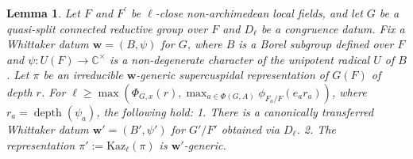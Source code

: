 \documentclass[american]{article}
\numberwithin{equation}{section}
\numberwithin{figure}{section}
\theoremstyle{plain}
\newtheorem{lemma}[theorem]{Lemma}
\theoremstyle{definition}
\theoremstyle{remark}
\begin{document}
\begin{lemma}\label{lem:kaz-preserves-genericity}
Let \(F\) and \(F^{\prime}\) be \(\ell\)-close non-archimedean local fields, and let \(G\) be a quasi-split connected reductive group over \(F\) and \(D_\ell\) be a congruence datum. Fix a Whittaker datum \(\mathbf{w} = (B, \psi)\) for \(G\), where \(B\) is a Borel subgroup defined over \(F\) and \(\psi: U(F) \to \mathbb{C}^\times\) is a non-degenerate character of the unipotent radical \(U\) of \(B\). Let \(\pi\) be an irreducible \(\mathbf{w}\)-generic supercuspidal representation of \(G(F)\) of depth \(r\). For  \(\ell \geq \max\left( \Phi_{G,x}(r), \max_{a \in \Phi(G,A)} \phi_{F_a/F}(e_a r_a) \right)\), where \(r_a = \operatorname{depth}(\psi_a)\), the following hold:  
1. There is a canonically transferred Whittaker datum \(\mathbf{w}' = (B', \psi')\) for \(G'/F'\) obtained via \(D_\ell\). 
2. The representation \(\pi' := \mathrm{Kaz}_\ell(\pi)\) is \(\mathbf{w}'\)-generic.  
\end{lemma}
\end{document}
